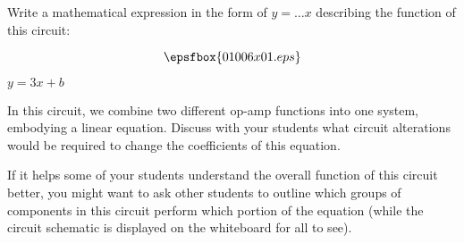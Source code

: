 

Write a mathematical expression in the form of $y = \dots x$ describing the function of this circuit:

$$\epsfbox{01006x01.eps}$$







$y = 3x + b$







In this circuit, we combine two different op-amp functions into one system, embodying a linear equation.  Discuss with your students what circuit alterations would be required to change the coefficients of this equation.

If it helps some of your students understand the overall function of this circuit better, you might want to ask other students to outline which groups of components in this circuit perform which portion of the equation (while the circuit schematic is displayed on the whiteboard for all to see).




